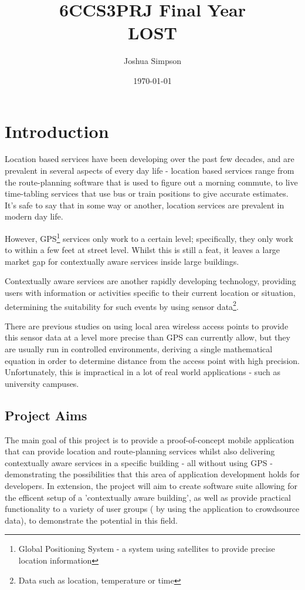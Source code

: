 \documentclass[11pt]{informatics-report}
\title{6CCS3PRJ Final Year\\\vspace{0.2cm} LOST}
\author{Joshua Simpson}
\date{\today}
\begin{document}
\createFrontMatter
\onehalfspacing
\tableofcontents
\doublespacing


\chapter{Introduction}
Location based services have been developing over the past few decades, and are prevalent in several aspects of every day life - location based services range from the route-planning software that is used to figure out a morning commute, to live time-tabling services that use bus or train positions to give accurate estimates. It's safe to say that in some way or another, location services are prevalent in modern day life.

However, GPS\footnote{ Global Positioning System - a system using satellites to provide precise location information} services only work to a certain level;  specifically, they only work to within a few feet at street level\cite{cook2005indoor}. Whilst this is still a feat, it leaves a large market gap for contextually aware services inside large buildings. 

Contextually aware services are another rapidly developing technology, providing users with information or activities specific to their current location or situation, determining the suitability for such events by using sensor data\footnote{ Data such as location, temperature or time }. 

There are previous studies on using local area wireless access points to provide this sensor data at a level more precise than GPS can currently allow, but they are usually run in controlled environments, deriving a single mathematical equation in order to determine distance from the access point with high precision\cite{996891}. Unfortunately, this is impractical in a lot of real world applications - such as university campuses.
\newline \newline 


\section{Project Aims}

The main goal of this project is to provide a proof-of-concept mobile application that can provide location and route-planning services whilst also delivering contextually aware services in a specific building - all without using GPS - demonstrating the possibilities that this area of application development holds for developers. In extension, the project will aim to create software suite allowing for the efficent setup of a 'contextually aware building', as well as provide practical functionality to a variety of user groups ( by using the application to crowdsource data), to demonstrate the potential in this field. 
\end{document}
